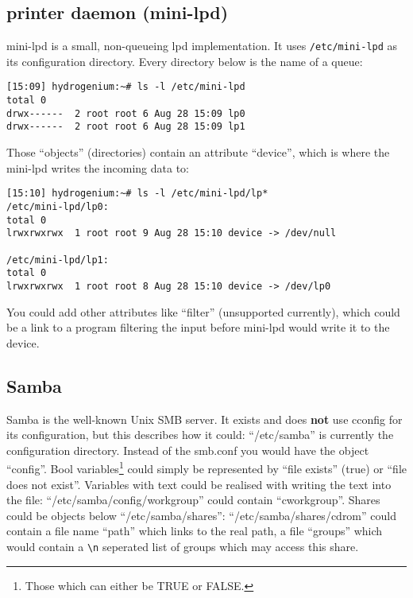 \documentclass[11pt,a4paper]{article}
\begin{document}
\subsection{printer daemon (mini-lpd)}
mini-lpd is a small, non-queueing lpd implementation. It uses
\verb=/etc/mini-lpd= as its configuration directory. Every directory
below is the name of a queue:
\begin{verbatim}
[15:09] hydrogenium:~# ls -l /etc/mini-lpd 
total 0
drwx------  2 root root 6 Aug 28 15:09 lp0
drwx------  2 root root 6 Aug 28 15:09 lp1
\end{verbatim}
Those "`objects"' (directories) contain an attribute "`device"', which
is where the mini-lpd writes the incoming data to:

\begin{verbatim}
[15:10] hydrogenium:~# ls -l /etc/mini-lpd/lp*
/etc/mini-lpd/lp0:
total 0
lrwxrwxrwx  1 root root 9 Aug 28 15:10 device -> /dev/null

/etc/mini-lpd/lp1:
total 0
lrwxrwxrwx  1 root root 8 Aug 28 15:10 device -> /dev/lp0
\end{verbatim}

You could add other attributes like "`filter"' (unsupported currently), which
could be a link to a program filtering the input before mini-lpd
would write it to the device.
\subsection{Samba}
Samba\cite{samba} is the well-known Unix SMB server. It exists and
does \textbf{not} use cconfig for its configuration, but this describes
how it could:
"`/etc/samba"' is currently the configuration directory. Instead of
the smb.conf you would have the object "`config"'. Bool
variables\footnote{Those which can either be TRUE or FALSE.} could simply
be represented by "`file exists"' (true) or "`file does not exist"'.
Variables with text could be realised with writing the text into the file:
"`/etc/samba/config/workgroup"' could contain "`cworkgroup"'.
Shares could be objects below "`/etc/samba/shares"':
"`/etc/samba/shares/cdrom"' could contain a file name "`path"' which links
to the real path, a file "`groups"' which would contain a \verb=\n= seperated
list of groups which may access this share.
\end{document}
